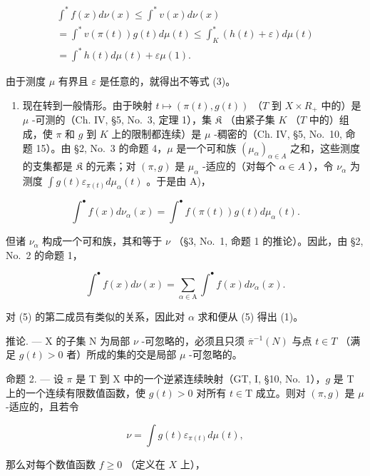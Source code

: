 \[
\begin{array}{l} \int^ {*} f (x) d \nu (x) \leqslant \int^ {*} v (x) d \nu (x) \\ = \int^ {*} v (\pi (t)) g (t) d \mu (t) \leqslant \int_ {K} ^ {*} (h (t) + \varepsilon) d \mu (t) \\ = \int^ {*} h (t) d \mu (t) + \varepsilon \mu (1). \end{array}\tag{4}
\]

由于测度 \(\mu\) 有界且 \(\varepsilon\) 是任意的，就得出不等式 (3)。

\begin{enumerate}
\def\labelenumi{\Alph{enumi})}
\setcounter{enumi}{1}
\tightlist
\item
  现在转到一般情形。由于映射 \(t \mapsto (\pi(t), g(t))\) （\(T\) 到 \(X \times R_{+}\) 中的）是 \(\mu\) -可测的（Ch. IV, §5, No.~3, 定理 1），集 \(\mathfrak{K}\) （由紧子集 \(K\) （\(T\) 中的）组成，使 \(\pi\) 和 \(g\) 到 \(K\) 上的限制都连续）是 \(\mu\) -稠密的（Ch. IV, §5, No.~10, 命题 15）。由 §2, No.~3 的命题 4，\(\mu\) 是一个可和族 \((\mu_{\alpha})_{\alpha \in A}\) 之和，这些测度的支集都是 \(\mathfrak{K}\) 的元素；对 \((\pi, g)\) 是 \(\mu_{\alpha}\) -适应的（对每个 \(\alpha \in A\) ），令 \(\nu_{\alpha}\) 为测度 \(\int g(t)\varepsilon_{\pi(t)} d\mu_{\alpha}(t)\) 。于是由 A)，
\end{enumerate}

\[
\int^ {\bullet} f (x) d \nu_ {\alpha} (x) = \int^ {\bullet} f (\pi (t)) g (t) d \mu_ {\alpha} (t).\tag{5}
\]

但诸 \(\nu_{\alpha}\) 构成一个可和族，其和等于 \(\nu\) （§3, No.~1, 命题 1 的推论）。因此，由 §2, No.~2 的命题 1，

\[
\int^ {\bullet} f (x) d \nu (x) = \sum_ {\alpha \in \mathrm{A}} \int^ {\bullet} f (x) d \nu_ {\alpha} (x).\tag{6}
\]

对 (5) 的第二成员有类似的关系，因此对 \(\alpha\) 求和便从 (5) 得出 (1)。

推论. --- X 的子集 N 为局部 \(\nu\) -可忽略的，必须且只须 \(\overline{\pi}^{-1}(N)\) 与点 \(t \in T\) （满足 \(g(t) > 0\) 者）所成的集的交是局部 \(\mu\) -可忽略的。

命题 2. --- 设 \(\pi\) 是 T 到 X 中的一个逆紧连续映射（GT, I, §10, No.~1），\(g\) 是 T 上的一个连续有限数值函数，使 \(g(t) > 0\) 对所有 \(t \in \mathrm{T}\) 成立。则对 \((\pi, g)\) 是 \(\mu\) -适应的，且若令

\[
\nu = \int g (t) \varepsilon_ {\pi (t)} d \mu (t),
\]

那么对每个数值函数 \(f \geqslant 0\) （定义在 \(X\) 上），

